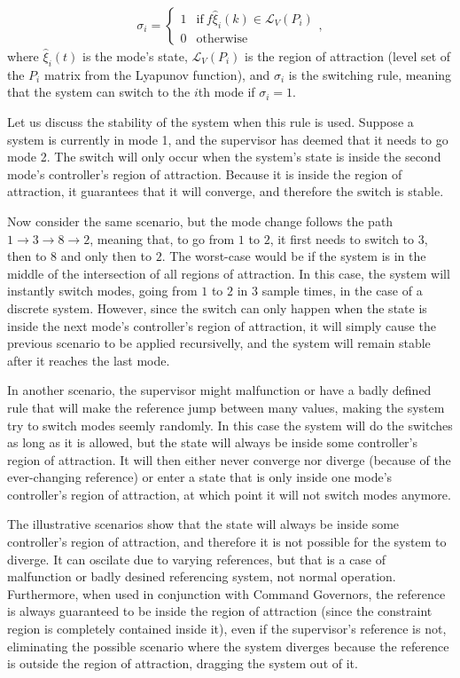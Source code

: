 \begin{align}
	\sigma_{i} = \begin{cases}
		1 & \textrm{if}~f\hat{\xi}_{i}(k)\in\mathcal{L}_V(P_i) \\
		0 & \textrm{otherwise}
	\end{cases},
\end{align}
%
where \(\hat{\xi}_{i}(t)\) is the mode's state, \(\mathcal{L}_V(P_i)\) is the
region of attraction (level set of the \(P_{i}\) matrix from the Lyapunov
function), and \(\sigma_{i}\) is the switching rule, meaning that the system can
switch to the \(i\)th mode if \(\sigma_{i}=1\).

Let us discuss the stability of the system when this rule is used. Suppose a
system is currently in mode 1, and the supervisor has deemed that it needs to go
mode 2. The switch will only occur when the system's state is inside the second
mode's controller's region of attraction. Because it is inside the region of
attraction, it guarantees that it will converge, and therefore the switch is
stable.

Now consider the same scenario, but the mode change follows the path
\(1 \rightarrow 3 \rightarrow 8 \rightarrow 2\), meaning that, to go from \(1\) to \(2\), it first needs to
switch to \(3\), then to \(8\) and only then to \(2\). The worst-case would be
if the system is in the middle of the intersection of all regions of attraction.
In this case, the system will instantly switch modes, going from \(1\) to \(2\)
in \(3\) sample times, in the case of a discrete system. However, since the
switch can only happen when the state is inside the next mode's controller's
region of attraction, it will simply cause the previous scenario to be applied
recursivelly, and the system will remain stable after it reaches the last mode.

In another scenario, the supervisor might malfunction or have a badly defined
rule that will make the reference jump between many values, making the system
try to switch modes seemly randomly. In this case the system will do the
switches as long as it is allowed, but the state will always be inside some
controller's region of attraction. It will then either never converge nor
diverge (because of the ever-changing reference) or enter a state that is only
inside one mode's controller's region of attraction, at which point it will not
switch modes anymore.

The illustrative scenarios show that the state will always be inside some
controller's region of attraction, and therefore it is not possible for the
system to diverge. It can oscilate due to varying references, but that is a case
of malfunction or badly desined referencing system, not normal operation.
Furthermore, when used in conjunction with Command Governors, the reference is
always guaranteed to be inside the region of attraction (since the constraint
region is completely contained inside it), even if the supervisor's reference is
not, eliminating the possible scenario where the system diverges because the
reference is outside the region of attraction, dragging the system out of it.

